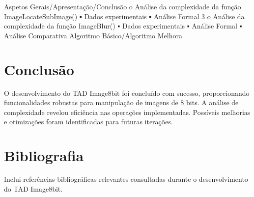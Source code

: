\documentclass{article}
\begin{document}
Aspetos Gerais/Apresentação/Conclusão
o Análise da complexidade da função ImageLocateSubImage()
▪ Dados experimentais
▪ Análise Formal
3
o Análise da complexidade da função ImageBlur()
▪ Dados experimentais
▪ Análise Formal
▪ Análise Comparativa Algoritmo Básico/Algoritmo Melhora












\section{Conclusão}

O desenvolvimento do TAD Image8bit foi concluído com sucesso, proporcionando funcionalidades robustas para manipulação de imagens de 8 bits. A análise de complexidade revelou eficiência nas operações implementadas. Possíveis melhorias e otimizações foram identificadas para futuras iterações.

\section{Bibliografia}

Inclui referências bibliográficas relevantes consultadas durante o desenvolvimento do TAD Image8bit.
\end{document}
